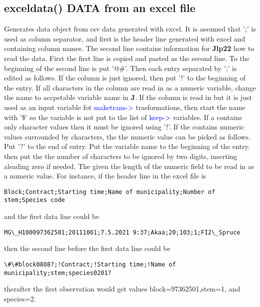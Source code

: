 \subsection{\textcolor{VioletRed}{exceldata}() DATA from an excel file}
\label{exceldata}
Generates data object from csv data generated with excel. It is assumed that ';' is used as column separator,
and first is the header line generated with excel and containing column names.
The second line contains information for \textbf{Jlp22} how to read the data.
First the first line is copied and pasted as the second line. To the beginning of the second line is put
'@\#'. Then each entry separated by ';' is edited as follows. If the column is just ignored, then
put '!' to the beginning of the entry. If all characters in the column are read in as
a numeric variable, change the name to accpetable variable name in \textbf{J}.
If the column is read in but it is just used as an input variable fot
\textcolor{blue}{maketrans->} trasformations, then start the name with '\$' so the variable is not put to
the list of \textcolor{blue}{keep->} variables. If a contains only character values then it must
be ignored using '!'. If the contains numeric values surrounded by characters, the the numeric value can be picked
as follows. Put '?' to the end of entry. Put the variable name to the beginning of the entry.
then put the the number of characters to be ignored by two digits, inserting
aleading zero if needed. The given the length of the numeric field to be read in as a numeric value.
For instance, if the header line in the excel file is
\color{Green}
\begin{verbatim}
Block;Contract;Starting time;Name of municipality;Number of stem;Species code
\end{verbatim}
\color{Black}
and the first data line could be
\color{Green}
\begin{verbatim}
MG\_H100097362501;20111001;7.5.2021 9:37;Akaa;20;103;1;FI2\_Spruce
\end{verbatim}
\color{Black}
then the second line before the first data line could be
\color{Green}
\begin{verbatim}
\#\#block0808?;!Contract;!Starting time;!Name of municipality;stem;species0201?
\end{verbatim}
\color{Black}
therafter the first observation would get values block=97362501,stem=1, and
species=2.

